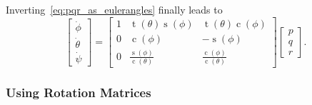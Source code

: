 \documentclass[10pt,a4paper,fleqn]{article}
\newcommand{\ssin}[0]{\operatorname{s}}
\newcommand{\scos}[0]{\operatorname{c}}
\newcommand{\stan}[0]{\operatorname{t}}
\begin{document}
%
Inverting~\eqref{eq:pqr_as_eulerangles} finally leads to 
%
\begin{equation}
\begin{bmatrix}
	\dot{\phi} \\ \dot{\theta} \\ \dot{\psi} 
\end{bmatrix} 
 =
\begin{bmatrix} 1 & \stan(\theta)\ssin(\phi) & \stan(\theta)\scos(\phi) \\ 0 & \scos(\phi) & -\ssin(\phi) \\ 0 & \frac{\ssin(\phi)}{\scos(\theta)}  & \frac{\scos(\phi)}{\scos(\theta)} \end{bmatrix}
\begin{bmatrix}
	p \\ q \\ r 
\end{bmatrix} .     
\end{equation}

\subsubsection{Using Rotation Matrices}\label{sec:dynamicsrotmat}
\end{document}
